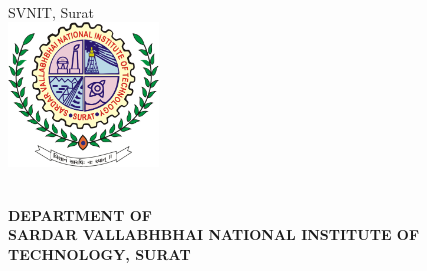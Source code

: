 \begin{center}
{{{{\InternalSupervisorDept{}\\
SVNIT, Surat} }}}
\\\vspace{25pt}
\includegraphics[width=0.3\textwidth]{assets/logo.png}
\vspace{10pt}\\
\normalsize \Year{}\\\vspace{5pt}

\large \textbf{DEPARTMENT OF \MakeUppercase{\Subject}\\\vspace{2pt}
SARDAR VALLABHBHAI NATIONAL INSTITUTE OF TECHNOLOGY, SURAT}
\end{center}
\normalsize
\setcounter{page}{0}
\newpage